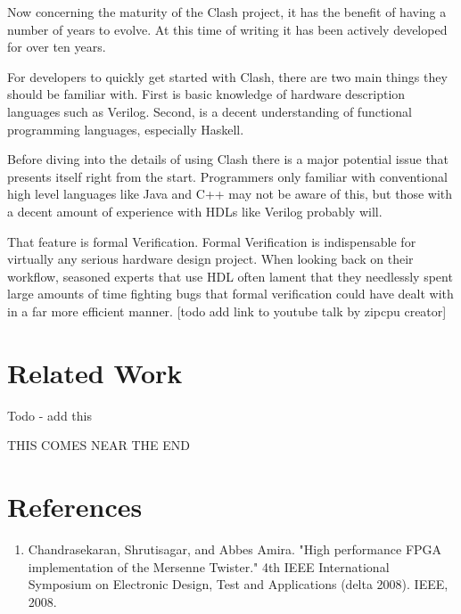 \documentclass{article}
\begin{document}
\begin{multicols}{2}
    Now concerning the maturity of the Clash project, it has the benefit of having
    a number of years to evolve. At this time of writing it has been actively
    developed for over ten years.

    For developers to quickly get started with Clash, there are two main things they
    should be familiar with. First is basic knowledge of hardware description languages
    such as Verilog. Second, is a decent understanding of functional programming
    languages, especially Haskell.

    Before diving into the details of using Clash there is a major potential issue
    that presents itself right from the start. Programmers only familiar with
    conventional high level languages like Java and C++ may not be aware of this,
    but those with a decent amount of experience with HDLs like Verilog probably will.

    That feature is formal Verification. Formal Verification is indispensable for
    virtually any serious hardware design project. When looking back on their workflow,
    seasoned experts that use HDL often lament that they needlessly spent
    large amounts of time fighting bugs that formal verification could have dealt with in
    a far more efficient manner. [todo add link to youtube talk by zipcpu creator]

    
     
    
    \section{Related Work}

    Todo - add this

    THIS COMES NEAR THE END

    
    \end{multicols}

    \break
    \section*{References}

    \begin{enumerate}

    \item Chandrasekaran, Shrutisagar, and Abbes Amira. "High performance FPGA implementation of the Mersenne Twister." 4th IEEE International Symposium on Electronic Design, Test and Applications (delta 2008). IEEE, 2008.

    \end{enumerate}
    
\end{document}
